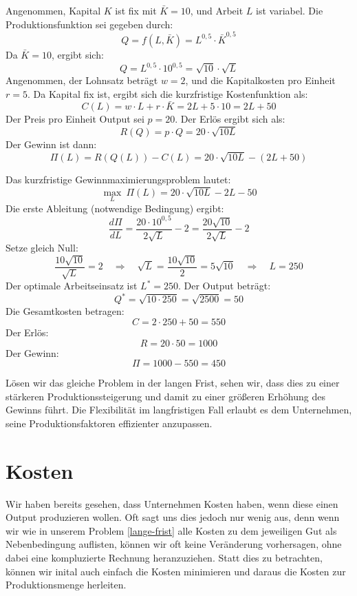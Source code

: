 \begin{example}
	Angenommen, Kapital \( K \) ist fix mit \( \bar{K} = 10 \), und Arbeit \( L \) ist variabel.
	Die Produktionsfunktion sei gegeben durch:
	\[
		Q = f(L, \bar{K}) = L^{0{,}5} \cdot \bar{K}^{0{,}5}
	\]
	Da \( \bar{K} = 10 \), ergibt sich:
	\[
		Q = L^{0{,}5} \cdot 10^{0{,}5} = \sqrt{10} \cdot \sqrt{L}
	\]
	Angenommen, der Lohnsatz beträgt \( w = 2 \), und die Kapitalkosten pro Einheit \( r = 5 \). Da Kapital fix ist, ergibt sich die kurzfristige Kostenfunktion als:
	\[
		C(L) = w \cdot L + r \cdot \bar{K} = 2L + 5 \cdot 10 = 2L + 50
	\]
	Der Preis pro Einheit Output sei \( p = 20 \). Der Erlös ergibt sich als:
	\[
		R(Q) = p \cdot Q = 20 \cdot \sqrt{10L}
	\]
	Der Gewinn ist dann:
	\[
		\Pi(L) = R(Q(L)) - C(L) = 20 \cdot \sqrt{10L} - (2L + 50)
	\]

	Das kurzfristige Gewinnmaximierungsproblem lautet:
	\[
		\max_L \ \Pi(L) = 20 \cdot \sqrt{10L} - 2L - 50
	\]
	Die erste Ableitung (notwendige Bedingung) ergibt:
	\[
		\frac{d\Pi}{dL} = \frac{20 \cdot 10^{0{,}5}}{2 \sqrt{L}} - 2 = \frac{20 \sqrt{10}}{2 \sqrt{L}} - 2
	\]
	Setze gleich Null:
	\[
		\frac{10 \sqrt{10}}{\sqrt{L}} = 2 \quad \Rightarrow \quad \sqrt{L} = \frac{10 \sqrt{10}}{2} = 5\sqrt{10} \quad \Rightarrow \quad L = 250
	\]
	Der optimale Arbeitseinsatz ist \( L^* = 250 \). Der Output beträgt:
	\[
		Q^* = \sqrt{10 \cdot 250} = \sqrt{2500} = 50
	\]
	Die Gesamtkosten betragen:
	\[
		C = 2 \cdot 250 + 50 = 550
	\]
	Der Erlös:
	\[
		R = 20 \cdot 50 = 1000
	\]
	Der Gewinn:
	\[
		\Pi = 1000 - 550 = 450
	\]

\end{example}

Lösen wir das gleiche Problem in der langen Frist, sehen wir, dass dies zu einer stärkeren Produktionssteigerung und damit zu einer
größeren Erhöhung des Gewinns führt.
Die Flexibilität im langfristigen Fall erlaubt es dem Unternehmen, seine Produktionsfaktoren effizienter anzupassen.

\section{Kosten}
Wir haben bereits gesehen, dass Unternehmen Kosten haben, wenn diese einen Output produzieren wollen. Oft sagt uns dies jedoch nur wenig aus, denn wenn wir wie in unserem Problem \ref{lange-frist} alle Kosten zu dem jeweiligen Gut als Nebenbedingung auflisten, können wir oft keine Veränderung vorhersagen, ohne dabei eine kompluzierte Rechnung heranzuziehen.
Statt dies zu betrachten, können wir inital auch einfach die Kosten minimieren und daraus die Kosten zur Produktionsmenge herleiten.
